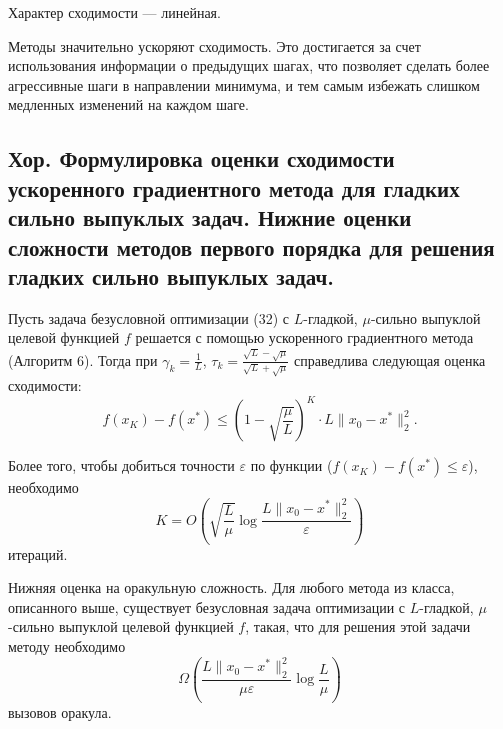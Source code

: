 Характер сходимости --- линейная.

\begin{note}
    Методы значительно ускоряют сходимость.
    Это достигается за счет использования информации о предыдущих шагах,
    что позволяет сделать более агрессивные шаги в направлении минимума,
    и тем самым избежать слишком медленных изменений на каждом шаге.
\end{note}


\subsection{Хор. Формулировка оценки сходимости
    ускоренного градиентного метода для гладких сильно выпуклых задач.
    Нижние оценки сложности методов первого порядка для решения гладких сильно выпуклых задач.}

\begin{theorem}
    Пусть задача безусловной оптимизации (32) с $L$-гладкой, $\mu$-сильно выпуклой целевой функцией $f$ решается с помощью ускоренного градиентного метода (Алгоритм 6). Тогда при $\gamma_k = \frac{1}{L}$, $\tau_k = \frac{\sqrt{L} - \sqrt{\mu}}{\sqrt{L} + \sqrt{\mu}}$ справедлива следующая оценка сходимости:
    $$f(x_K) - f(x^*) \leq \left( 1 - \sqrt{\frac{\mu}{L}} \right)^K \cdot L \|x_0 - x^*\|_2^2.$$

    Более того, чтобы добиться точности $\varepsilon$ по функции ($f(x_K) - f(x^*) \leq \varepsilon$), необходимо
    $$K = O\left( \sqrt{\frac{L}{\mu}} \log \frac{L \|x_0 - x^*\|_2^2}{\varepsilon} \right)$$
    итераций.

\end{theorem}

\begin{theorem}
    Нижняя оценка на оракульную сложность. Для любого метода из класса, описанного выше, существует безусловная задача оптимизации с $L$-гладкой, $\mu$-сильно выпуклой целевой функцией $f$, такая, что для решения этой задачи методу необходимо
    $$\Omega\left( \frac{L \| x_0 - x^* \|_2^2}{\mu \varepsilon} \log \frac{L}{\mu} \right)$$
    вызовов оракула.

\end{theorem}
